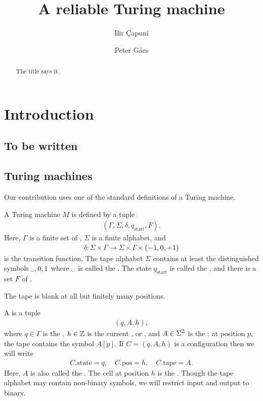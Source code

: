 \documentclass[12pt]{memoir}
\newcommand{\blank}{\text{\textvisiblespace}}
\newcommand{\h}{h}
\newcommand{\pos}{\mathrm{pos}}
\newcommand{\start}{\mathrm{start}}
\newcommand{\state}{\mathrm{state}}
\newcommand{\tape}{\mathrm{tape}}
\begin{document}
\title{A reliable Turing machine}

\author{Ilir \c{C}apuni \and Peter G\'acs}

\maketitle
\thispagestyle{empty}

\begin{abstract}
The title says it.
\end{abstract}

\section{Introduction}

\subsection{To be written}

\subsection{Turing machines}\label{sec:TM}

Our contribution uses one of the standard definitions of a Turing
machine.

    A Turing machine $M$ is defined by a tuple
        \begin{align*}
             (\Gamma, \Sigma,\delta, q_{\start},F).
        \end{align*}
    Here, $\Gamma$ is a finite set of ,
    $\Sigma$ is a finite alphabet, and
        \begin{align*}
             \delta\colon\Sigma\times \Gamma\to \Sigma\times\Gamma\times\{-1,0,+1\}
        \end{align*}
    is the transition function.
The tape alphabet $\Sigma$ contains at least the distinguished
symbols $\blank,0,1$ where $\blank$ is called the .
The state $q_{\start}$ is called the , and
there is a set $F$ of .

    The tape is blank at all but finitely many positions.

    A  is a tuple
        \begin{align*}
             (q,A,\h),
        \end{align*}
    where $q\in\Gamma$ is the , 
$\h\in\bbZ$ is the current , or ,
and $A\in\Sigma^{\mathbb{Z}}$ is the : 
at position \( p \), the tape contains the symbol \( A[p] \).
If $C=(q,A,\h)$ is a configuration then we will write
        \begin{align*}
             C.\state=q,\quad C.\pos=\h, \quad C.\tape=A.
        \end{align*}
    Here, $A$ is also called the .
    The cell at position $\h$ is the  .
Though the tape alphabet may contain
non-binary symbols, we will restrict input and output to binary.
\end{document}
